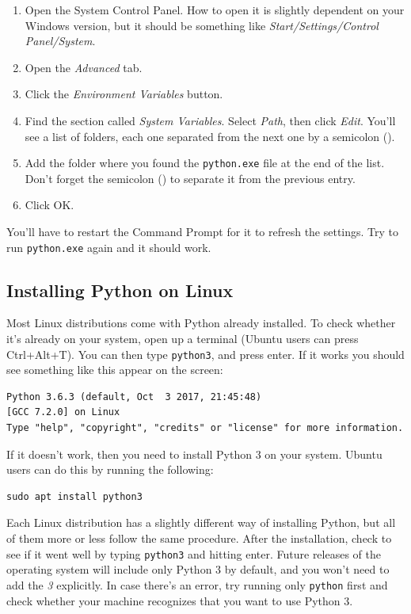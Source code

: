 \begin{enumerate}
    \item Open the System Control Panel. How to open it is slightly dependent on your Windows version, but it should be something like \emph{Start/Settings/Control Panel/System}.
    \item Open the \emph{Advanced} tab.
    \item Click the \emph{Environment Variables} button.
    \item Find the section called \emph{System Variables}. Select \emph{Path}, then click \emph{Edit}. You'll see a list of folders, each one separated from the next one by a semicolon (\py{;}).
    \item Add the folder where you found the \texttt{python.exe} file at the end of the list. Don't forget the semicolon (\py{;}) to separate it from the previous entry.
    \item Click OK\@.
\end{enumerate}

You'll have to restart the Command Prompt for it to refresh the settings. Try to run \texttt{python.exe} again and it should work.

\subsection{Installing Python on Linux}\label{subsec:installation-on-linux}
Most Linux distributions come with Python already installed. To check whether it's already on your system, open up a terminal (Ubuntu users can press Ctrl+Alt+T). You can then type \texttt{python3}, and press enter. If it works you should see something like this appear on the screen:

\begin{verbatim}
Python 3.6.3 (default, Oct  3 2017, 21:45:48)
[GCC 7.2.0] on Linux
Type "help", "copyright", "credits" or "license" for more information.
\end{verbatim}

If it doesn't work, then you need to install Python 3 on your system. Ubuntu users can do this by running the following:
\begin{verbatim}
sudo apt install python3
\end{verbatim}

Each Linux distribution has a slightly different way of installing Python, but all of them more or less follow the same procedure. After the installation, check to see if it went well by typing \texttt{python3} and hitting enter. Future releases of the operating system will include only Python 3 by default, and you won't need to add the \emph{3} explicitly. In case there's an error, try running only \texttt{python} first and check whether your machine recognizes that you want to use Python 3.

